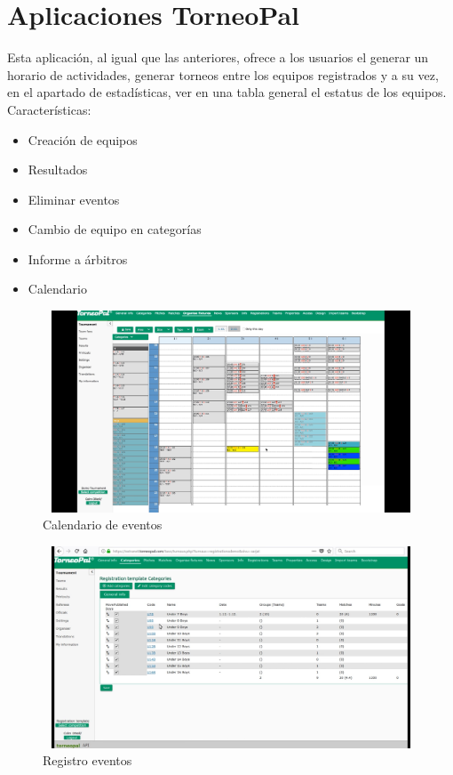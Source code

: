 	\section{Aplicaciones TorneoPal}
	Esta aplicación, al igual que las anteriores, ofrece a los usuarios el generar un horario de actividades, generar torneos entre los equipos registrados y a su vez, en el apartado de estadísticas, ver en una tabla general el estatus de los equipos.
	Características: 
	\begin{itemize}
		\item Creación de equipos
		\item Resultados
		\item Eliminar eventos
		\item Cambio de equipo en categorías
		\item Informe a árbitros
		\item Calendario
		
	\end{itemize}
	\begin{figure}[h!]
		\centering
		\includegraphics[width=12cm, height=6cm]{Imagenes/Aplicaciones/TP1.png}
		\caption{Calendario de eventos}
	\end{figure}
	\begin{figure}[h!]
		\centering
		\includegraphics[width=12cm, height=6cm]{Imagenes/Aplicaciones/TP2.png}
		\caption{Registro eventos}
	\end{figure}
	\pagebreak
	
